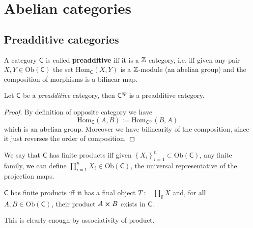\documentclass[../Main]{subfiles}
\begin{document}
\section{Abelian categories}
\subsection{Preadditive categories}
\begin{defn}
	A category $\mathsf{C}$ is called \textbf{preadditive} iff it is a $\mathbb{Z}$ category, i.e. iff
	given any pair $X,Y \in \mathrm{Ob} \left(\mathsf{C}\right)$ the set $\mathrm{Hom}_{\mathsf{C}} \left( X, Y \right)$ is a $\mathbb{Z}$-module (an abelian group) and the composition of morphisms is a bilinear map.
\end{defn}

\begin{lem}\label{lem:OppositeIsPreadditive}
	Let $\mathsf{C}$ be a {\em preadditive} category, then $\mathsf{C}^{op}$ is a preadditive category.
\end{lem} 
\begin{proof}
	By definition of opposite category we have
	\begin{equation}
	\mathrm{Hom}_{\mathsf{C}} \left( A, B \right) :=
	\mathrm{Hom}_{\mathsf{C}^{op}} \left( B, A \right)
	\end{equation} 
	which is an abelian group. Moreover we have bilinearity of the composition,
	since it just reverses the order of composition.
\end{proof}

\begin{rem}[]
	We say that $\mathsf{C}$ has finite products iff
	given $\left\{ X_i \right\}_{i = 1}^n \subset \mathrm{Ob} \left(\mathsf{C}\right)$,
	any finite family,
	we can define $\prod_{i = 1}^n X_i  \in \mathrm{Ob} \left(\mathsf{C}\right)$,
	the universal representative of the projection maps.
\end{rem}

\begin{rem}[]\label{rem:EquivFiniteProd}
	$\mathsf{C}$ has finite products iff it has a final object $T := \prod_{\emptyset} X$
	and, for all $A, B \in \mathrm{Ob} \left(\mathsf{C}\right)$, 
	their product $A \cross B$ exists in $\mathsf{C}$.

	This is clearly enough by associativity of product.
\end{rem}
\end{document}
